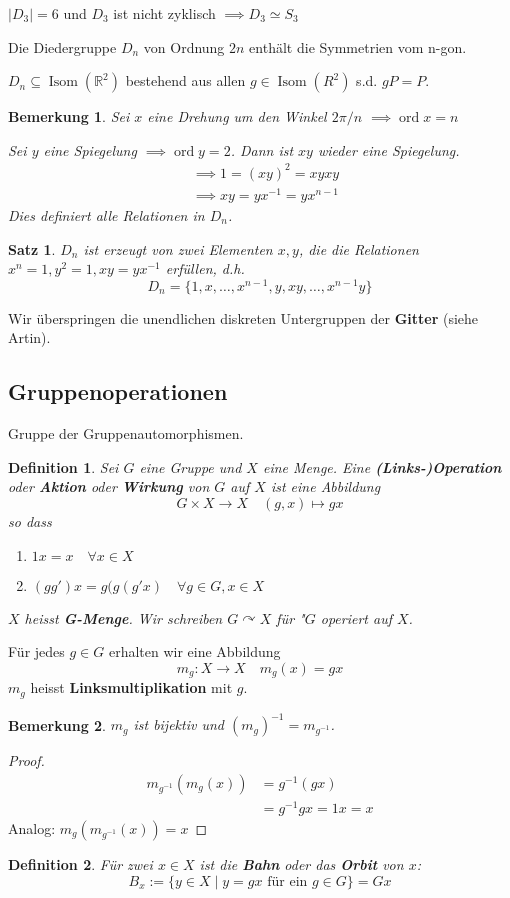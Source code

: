 \documentclass{article}
\theoremstyle{plain}
\newtheorem{definition}{Definition}
\newtheorem{theorem}{Satz}
\newtheorem{bemerkung}{Bemerkung}
\newcommand{\defn}[1]{\textbf{#1}}
\newcommand{\defeq}{:=}
\newcommand{\R}{\mathbb{R}}
\newcommand{\ord}{\mathop{\text{ord}}}
\newcommand{\iso}{\simeq}
\newcommand{\isom}{\mathop\text{Isom}}
\newcommand{\operateson}{\curvearrowright}
\begin{document}
$|D_3|=6$ und $D_3$ ist nicht zyklisch $\implies 
D_3\iso S_3$ 

Die Diedergruppe $D_n$ von Ordnung $2n$ enthält die Symmetrien vom n-gon.

$D_n\subseteq\isom(\R^2)$ bestehend aus allen $g\in \isom(R^2)$ s.d. $gP=P$.


\begin{bemerkung}
    Sei $x$ eine Drehung um den Winkel $2\pi/ n$ 
    $\implies \ord x=n$
    
    Sei $y$ eine Spiegelung $\implies \ord y =2$.
    Dann ist $xy$ wieder eine Spiegelung.
    \begin{align*}
        &\implies 1=(xy)^2=xyxy\\
        &\implies xy=yx^{-1}=yx^{n-1}
    \end{align*}
    Dies definiert alle Relationen in $D_n$.
\end{bemerkung}

\begin{theorem}
    $D_n$ ist erzeugt von zwei Elementen $x,y$, die die Relationen $x^n=1, y^2=1, xy=yx^{-1}$ erfüllen, d.h. 
    $$D_n=\{1,x,\ldots,x^{n-1},y,xy,\ldots,x^{n-1}y\}$$
\end{theorem}

Wir überspringen die unendlichen diskreten Untergruppen der \defn{Gitter} (siehe Artin).

\subsection*{Gruppenoperationen}
Gruppe der Gruppenautomorphismen.

\begin{definition}
    Sei $G$ eine Gruppe und $X$ eine Menge. Eine \defn{(Links-)Operation} oder \defn{Aktion} oder \defn{Wirkung} von $G$ auf $X$ ist eine Abbildung 
    $$G\times X\to X\quad (g,x)\mapsto gx$$
    so dass 
    \begin{enumerate}[label=(\alph*)]
        \item $1x=x\quad \forall x\in X$
        \item $(gg')x=g(g(g'x)\quad \forall g\in G, x\in X$
    \end{enumerate}
    $X$ heisst \defn{G-Menge}. Wir schreiben $G \operateson X$ für "$G$ operiert auf $X$.
\end{definition}
Für jedes $g\in G$ erhalten wir eine Abbildung
$$m_g\colon X\to X\quad m_g(x)=gx$$
$m_g$ heisst \defn{Linksmultiplikation} mit $g$.
\begin{bemerkung}
    $m_g$ ist bijektiv und $(m_g)^{-1}=m_{g^{-1}}$.
\end{bemerkung}
\begin{proof}
    \begin{align*}    
        m_{g^{-1}}(m_g(x))&=g^{-1}(gx)\\
        &=g^{-1}gx =1x=x
    \end{align*}
    Analog: $m_g(m_{g^{-1}}(x))=x$
\end{proof}
\begin{definition}
    Für zwei $x\in X$ ist die \defn{Bahn} oder das \defn{Orbit} von $x$:
    $$B_x\defeq\{y\in X\mid y=gx\text{ für ein } g\in G\} = Gx$$
\end{definition}
\end{document}
